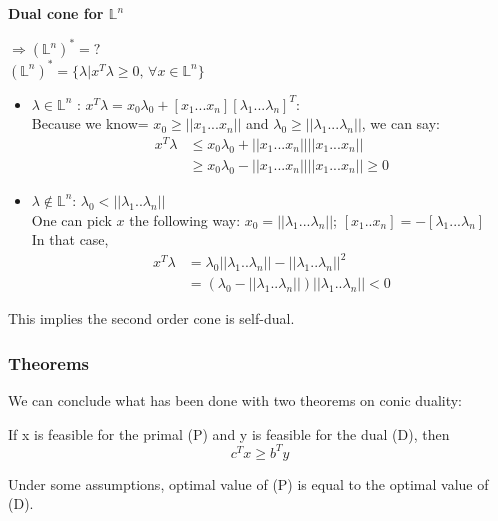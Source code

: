 \begin{example}
\begin{leftbar} 
\textbf{Dual cone for $\mathbb{L}^n$}

$\Rightarrow(\mathbb{L}^n)^*=?$\\
$(\mathbb{L}^n)^*=\{\lambda | x^T \lambda \geq 0\textrm{, } \forall x \in \mathbb{L}^n \}$
\begin{itemize}
\item $\lambda \in \mathbb{L}^n$ : $x^T\lambda = x_0\lambda_0 + [x_1 ... x_n][\lambda_1 ... \lambda_n]^T$:\\
Because we know= $x_0\geq ||x_1...x_n||$ and $\lambda_0 \geq ||\lambda_1...\lambda_n||$, we can say: \begin{align*}
x^T\lambda &\leq x_0\lambda_0+||x_1...x_n||||x_1...x_n||\\
&\geq x_0\lambda_0-||x_1...x_n||||x_1...x_n|| \geq 0
\end{align*}
\item $\lambda \notin \mathbb{L}^n$: $\lambda_0 < ||\lambda_1 ..  \lambda_n||$ \\
One can pick $x$ the following way: $x_0 = ||\lambda_1...\lambda_n||$; $[x_1..x_n] = -[\lambda_1 ... \lambda_n]$\\
In that case, \begin{align*}
x^T\lambda &= \lambda_0||\lambda_1 ..  \lambda_n|| - ||\lambda_1 ..  \lambda_n||^2\\
&= (\lambda_0 - ||\lambda_1 ..  \lambda_n||)||\lambda_1 ..  \lambda_n||<0
\end{align*}
\end{itemize}
This implies the second order cone is self-dual.

\end{leftbar}
\end{example}

\subsubsection{Theorems}
We can conclude what has been done with two theorems on conic duality:

\begin{theorem}
If x is feasible for the primal (P) and y is feasible for the dual (D), then $$c^Tx\ge b^Ty$$
\end{theorem}

\begin{theorem}
Under some assumptions, optimal value of (P) is equal to the optimal value of (D).
\end{theorem}




%
